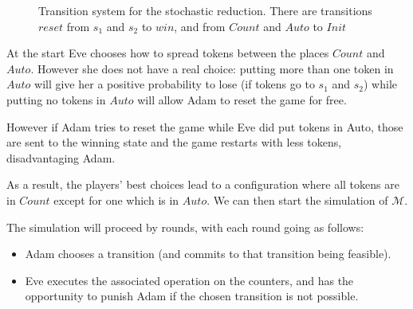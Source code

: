 \documentclass{article}
\begin{document}
\begin{figure}[h]
		\caption{Transition system for the stochastic reduction. There are transitions $reset$ from $s_1$ and $s_2$ to $win$, and from $Count$ and $Auto$ to $Init$}
	\label{fig-sreach1}
\end{figure}

At the start Eve chooses how to spread tokens between the places $Count$ and $Auto$. 
However she does not have a real choice: putting more than one token in $Auto$ will give her a positive probability to lose (if tokens go to $s_1$ and $s_2$) while putting no tokens in $Auto$ will allow Adam to reset the game for free.

However if Adam tries to reset the game while Eve did put tokens in Auto, those are sent to the winning state and the game restarts with less tokens, disadvantaging Adam. 

As a result, the players' best choices lead to a configuration where all tokens are in $Count$ except for one which is in $Auto$. We can then start the simulation of $\mathcal{M}$.

The simulation will proceed by rounds, with each round going as follows:
\begin{itemize}
	\item Adam chooses a transition (and commits to that transition being feasible).
	
	\item Eve executes the associated operation on the counters, and has the opportunity to punish Adam if the chosen transition is not possible.  
\end{itemize}
\end{document}
